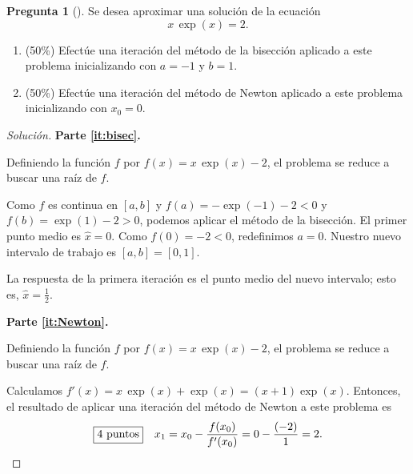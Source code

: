 \documentclass[letter,12pt]{article}
\theoremstyle{definition}
\newtheorem{question}{Pregunta}
\numberwithin{equation}{question}
\newenvironment{solution}{\begin{proof}[Solución]}{\end{proof}}
\begin{document}
\begin{question}[] Se desea aproximar una solución de la ecuación
%
\begin{equation*}
x \, \exp(x) = 2.
\end{equation*}
%
\begin{enumerate}
\item\label{it:bisec} (50\%) Efectúe una iteración del método de la bisección aplicado a este problema inicializando con $a = -1$ y $b = 1$.
\item\label{it:Newton} (50\%) Efectúe una iteración del método de Newton aplicado a este problema inicializando con $x_0 = 0$.
\end{enumerate}

\begin{solution}
\textbf{Parte \ref{it:bisec}.}

 Definiendo la función $f$ por $f(x) = x\,\exp(x)-2$, el problema se reduce a buscar una raíz de $f$.

 Como $f$ es continua en $[a,b]$ y $f(a) = -\exp(-1)-2 < 0$ y $f(b) = \exp(1)-2 > 0$, podemos aplicar el método de la bisección.
El primer punto medio es $\hat x = 0$.
Como $f(0) = -2 < 0$, redefinimos $a = 0$.
Nuestro nuevo intervalo de trabajo es $[a,b] = [0,1]$.

 La respuesta de la primera iteración es el punto medio del nuevo intervalo; esto es, $\hat x = \frac{1}{2}$.

\medskip

\textbf{Parte \ref{it:Newton}.}

\smallskip
\noindent{}
Definiendo la función $f$ por $f(x) = x\,\exp(x)-2$, el problema se reduce a buscar una raíz de $f$.


 Calculamos $f'(x) = x \, \exp(x) + \exp(x) = (x+1) \exp(x)$.
Entonces, el resultado de aplicar una iteración del método de Newton a este problema es
%
\begin{equation*}
\text{\framebox{4 puntos}} \quad x_1 = x_0 - \frac{f(x_0)}{f'(x_0)} = 0 - \frac{(-2)}{1} = 2.
\end{equation*}

\end{solution}
\end{question}
\end{document}
